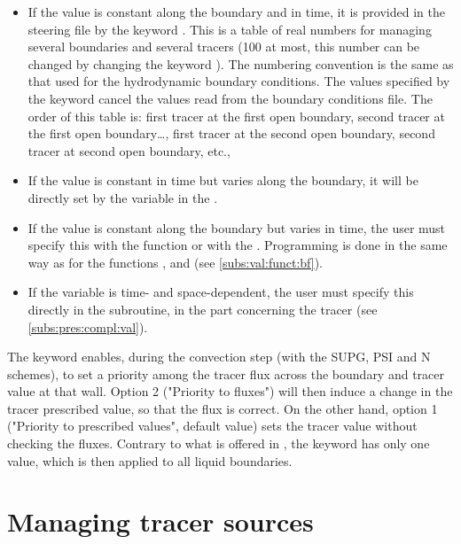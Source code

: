 \begin{itemize}
\item If the value is constant along the boundary and in time, it is provided
in the steering file by the keyword .
This is a table of real numbers for managing several boundaries and several
tracers (100 at most, this number can be changed by changing the keyword
).
The numbering convention is the same as that used for the hydrodynamic boundary
conditions.
The values specified by the keyword cancel the values read from the boundary
conditions file.
The order of this table is: first tracer at the first open boundary,
second tracer at the first open boundary\ldots,
first tracer at the second open boundary,
second tracer at second open boundary, etc.,

\item If the value is constant in time but varies along the boundary,
it will be directly set by the  variable
in the .

\item If the value is constant along the boundary but varies in time,
the user must specify this with the function  or with the
.
Programming is done in the same way as for the functions ,
 and  (see \ref{subs:val:funct:bf}).

\item If the variable is time- and space-dependent, the user must specify
this directly in the  subroutine,
in the part concerning the tracer (see \ref{subs:pres:compl:val}).
\end{itemize}

The keyword  enables,
during the convection step (with the SUPG, PSI and N schemes), to set a
priority among the tracer flux across the boundary and tracer value at that wall.
Option 2 ("Priority to fluxes") will then induce a change in the tracer
prescribed value, so that the flux is correct.
On the other hand, option 1 ("Priority to prescribed values", default value)
sets the tracer value without checking the fluxes.
Contrary to what is offered in , the  keyword has only
one value, which is then applied to all liquid boundaries.


\section{Managing tracer sources}


